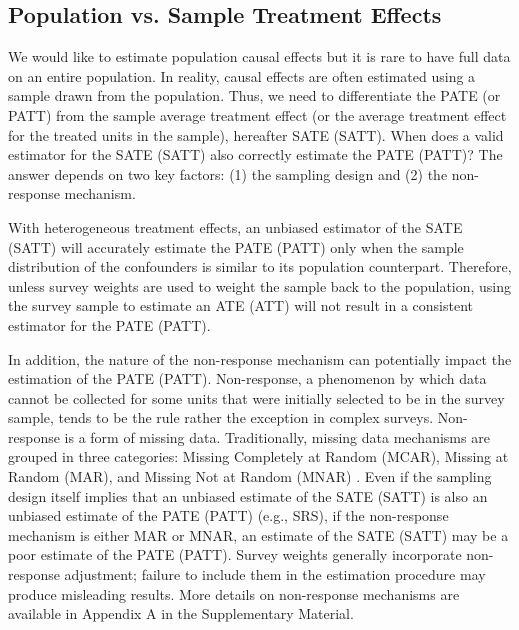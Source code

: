 \documentclass[oupdraft]{bio}
\begin{document}
\subsection{Population vs. Sample Treatment Effects}
We would like to estimate population causal effects but it is rare to have full data on an entire population. In reality, causal effects are often estimated using a sample drawn from the population. Thus, we need to differentiate the PATE (or PATT) from the sample average treatment effect (or the average treatment effect for the treated units in the sample), hereafter SATE (SATT). When does a valid estimator for the SATE (SATT) also correctly estimate the PATE (PATT)? The answer depends on two key factors: (1) the sampling design and (2) the non-response mechanism. 

With heterogeneous treatment effects, an unbiased estimator of the SATE (SATT) will accurately estimate the PATE (PATT) only when the sample distribution of the confounders is similar to its population counterpart. Therefore, unless survey weights are used to weight the sample back to the population, using the survey sample to estimate an ATE (ATT) will not result in a consistent estimator for the PATE (PATT).
 
In addition, the nature of the non-response mechanism can potentially impact the estimation of the PATE (PATT). Non-response, a phenomenon by which  data cannot be collected for some units that were initially selected to be in the survey sample, tends to be the rule rather the exception in complex surveys. Non-response is a form of missing data. Traditionally, missing data mechanisms are grouped in three categories: Missing Completely at Random (MCAR), Missing at Random (MAR), and Missing Not at Random (MNAR) \citep{little1989analysis}.
Even if the sampling design itself implies that an unbiased estimate of the SATE (SATT) is also an unbiased estimate of the PATE (PATT) (e.g., SRS), if the non-response mechanism is either MAR or MNAR, an estimate of the SATE (SATT) may be a poor estimate of the PATE (PATT). Survey weights generally incorporate non-response adjustment; failure to include them in the estimation procedure may produce misleading results. More details on non-response mechanisms are available in Appendix A in the Supplementary Material.
\end{document}

